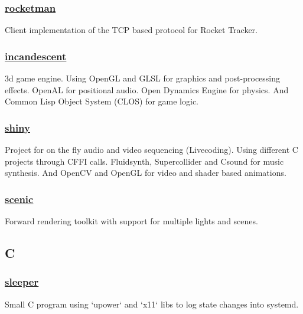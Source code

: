 \documentclass[11pt]{article}
\begin{document}
\subsubsection{\href {https://github.com/azimut/rocketman} {rocketman}}
Client implementation of the TCP based protocol for Rocket Tracker.
\subsubsection{\href {https://github.com/azimut/incandescent} {incandescent}}
3d game engine. Using OpenGL and GLSL for graphics and post-processing effects. OpenAL for positional audio. Open Dynamics Engine for physics. And Common Lisp Object System (CLOS) for game logic.
\subsubsection{\href {https://github.com/azimut/shiny} {shiny}}
Project for on the fly audio and video sequencing (Livecoding). Using different C projects through CFFI calls. Fluidsynth, Supercollider and Csound for music synthesis. And OpenCV and OpenGL for video and shader based animations.
\subsubsection{\href {https://github.com/azimut/scenic} {scenic}}
Forward rendering toolkit with support for multiple lights and scenes.

\subsection{C}
\subsubsection{\href {https://github.com/azimut/sleeper} {sleeper}}
Small C program using `upower` and `x11` libs to log state changes into systemd.
\end{document}
